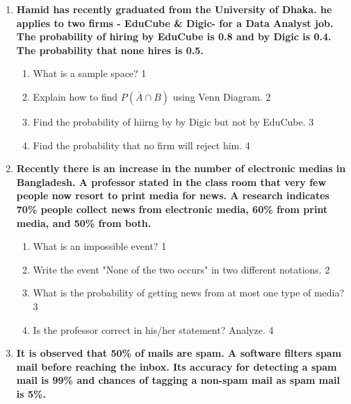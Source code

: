 \documentclass[a4paper,oneside]{book}
\begin{document}
\begin{enumerate}
  \begin{enumerate}
    \item  
	Find the number of products characterized as “personal use” \hfill 3
    \item
	Question \hfill 4
  \end{enumerate}

  
   \item
  \textbf{Hamid has recently graduated from the University of Dhaka. he applies to two firms - EduCube \& Digic- for a Data Analyst job. The probability of hiring by EduCube is 0.8 and by Digic is 0.4. The probability that none hires is 0.5.} 
  
  \begin{enumerate}
    \item
	What is a sample space? \hfill 1
    \item
	Explain how to find $P(\bar A \cap B)$ using Venn Diagram. \hfill 2
    \item  
	Find the probability of hiirng by by Digic but not by EduCube. \hfill 3
    \item
	Find the probability that no firm will reject him. \hfill 4
  \end{enumerate}

 \item
	  \textbf{Recently there is an increase in the number of electronic medias in Bangladesh. A professor stated in the class room that very few people now resort to print media for news. A research indicates 70\% people collect news from electronic media, 60\% from print media, and 50\% from both.} 
  
  \begin{enumerate}
    \item
	What is an impossible event? \hfill 1
    \item
	Write the event "None of the two occurs" in two different notations. \hfill 2
    \item  
	What is the probability of getting news from at most one type of media? \hfill 3
    \item
	Is the professor correct in his/her statement? Analyze. \hfill 4
  \end{enumerate}
  
  
     \item
	  \textbf{It is observed that 50\% of mails are spam. A software 
	  filters spam mail before reaching the inbox. Its accuracy for detecting a spam mail is 99\% and chances of tagging a non-spam mail as spam mail is 5\%.} 
  

\end{enumerate}
\end{document}
